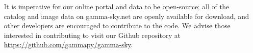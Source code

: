     It is imperative for our online portal and data to be open-source; all of the catalog and image data on gamma-sky.net are
    openly available for download, and other developers are encouraged to contribute to the code. We advise those interested
    in contributing to visit our Github repository at \url{https://github.com/gammapy/gamma-sky}.
